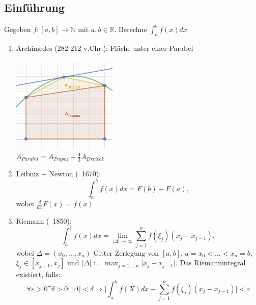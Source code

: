 \subsection{Einführung}

\begin{problem}
Gegeben $f: [a,b] \rightarrow \mathbb{N}$ mit $a, b \in \mathbb{R}$.
Berechne $\int_a^b f(x) dx $
\end{problem}

\begin{example}
\begin{description}
  \item 
\end{description}
\begin{enumerate}
  \item Archimedes (282-212 v.Chr.): Fläche unter einer Parabel \\ \\
    \includegraphics[width=5cm]{Kapitel_1/Grafiken/Grafik_1.png} \\
    $A_{Parabel} = A_{Trapez} + \frac{4}{3} A_{Dreieck}$
  \item Leibniz + Newton (~1670):
    $$ \int_a^b f(x) dx = F(b) - F(a),$$ wobei $\frac{d}{dx} F(x) = f(x)$
  \item Riemann (~1850): 
    $$ \int_a^b f(x) dx = \lim\limits_{\vert \Delta \vert \to \infty} \sum_{j=1}^n f(\xi_j)(x_j - x_{j-1}),$$
    wobei $\Delta = (x_0,...,x_n)$ Gitter Zerlegung von $[a, b]$, $a=x_0 < ...< x_n = b$, $\xi_j \in [x_{j-1}, x_j]$ und $\vert \Delta \vert := \max_{j=1,...n} \vert x_j - x_{j-1} \vert$.
    Das Riemannintegral existiert, falls: 
    $$ \forall \varepsilon > 0 \exists \delta > 0: \vert \Delta \vert < \delta \Rightarrow \vert \int_a^b f(X) dx - \sum_{j=1}^n f(\xi_j)(x_j-x_{j-1}) \vert < \varepsilon $$
\end{enumerate}
\end{example}

